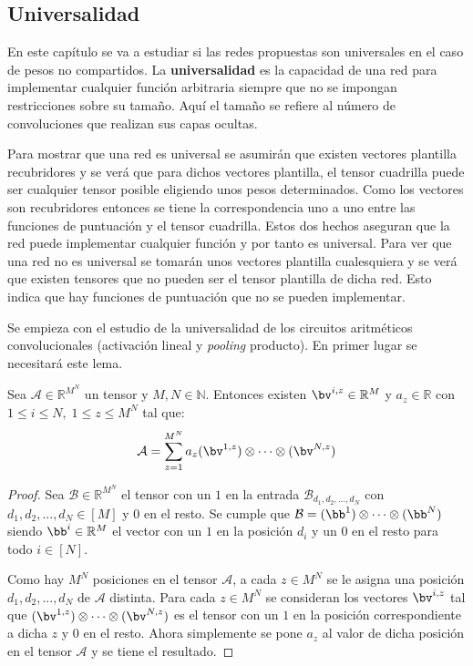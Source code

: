 \subsection{Universalidad}

En este capítulo se va a estudiar si las redes propuestas son universales en el caso de pesos no compartidos. La \textbf{universalidad} es la capacidad de una red para implementar cualquier función arbitraria siempre que no se impongan restricciones sobre su tamaño. Aquí el tamaño se refiere al número de convoluciones que realizan sus capas ocultas. 

Para mostrar que una red es universal se asumirán que existen vectores plantilla recubridores y se verá que para dichos vectores plantilla, el tensor cuadrilla puede ser cualquier tensor posible eligiendo unos pesos determinados. Como los vectores son recubridores entonces se tiene la correspondencia uno a uno entre las funciones de puntuación y el tensor cuadrilla. Estos dos hechos aseguran que la red puede implementar cualquier función y por tanto es universal. Para ver que una red no es universal se tomarán unos vectores plantilla cualesquiera y se verá que existen tensores que no pueden ser el tensor plantilla de dicha red.  Esto indica que hay funciones de puntuación que no se pueden implementar. 

Se empieza con el estudio de la universalidad de los circuitos aritméticos convolucionales (activación lineal y \textit{pooling} producto). En primer lugar se necesitará este lema.

\begin{lema}
Sea $\mathcal{A}\in\mathbb{R}^{M^N}$ un tensor y $M,N\in\mathbb{N}$. Entonces existen $\bv^{i,z}\in\mathbb{R}^M$ y $a_z\in\mathbb{R}$ con $1 \leq i \leq N, \; 1 \leq z \leq M^N$ tal que:
\begin{align*}
\mathcal{A}=\sum_{z=1}^{M^N}a_z(\bv^{1,z})\otimes\cdots \otimes(\bv^{N,z})
\end{align*}
\end{lema}
\begin{proof}
Sea $\mathcal{B}\in\mathbb{R}^{M^N}$ el tensor con un $1$ en la entrada  $\mathcal{B}_{d_1,d_2,... ,d_N}$ con $d_1,d_2,... ,d_N\in[M]$ y $0$ en el resto. Se cumple que $\mathcal{B} = (\bb^1)\otimes\cdots \otimes(\bb^N)$ siendo $\bb^i\in\mathbb{R}^M$ el vector con un $1$ en la posición $d_i$ y un $0$ en el resto para todo $i\in[N]$.  

Como hay $M^N$ posiciones en el tensor $\mathcal{A}$, a cada $z\in M^N$ se le asigna una posición $d_1,d_2,... ,d_N$ de $\mathcal{A}$ distinta. Para cada $z\in M^N$ se consideran los vectores $\bv^{i,z}$ tal que  $(\bv^{1,z})\otimes\cdots \otimes(\bv^{N,z})$ es el tensor con un $1$ en la posición correspondiente a dicha $z$ y $0$ en el resto. Ahora simplemente se pone $a_z$ al valor de dicha posición en el tensor $\mathcal{A}$ y se tiene el resultado.
\end{proof}	

